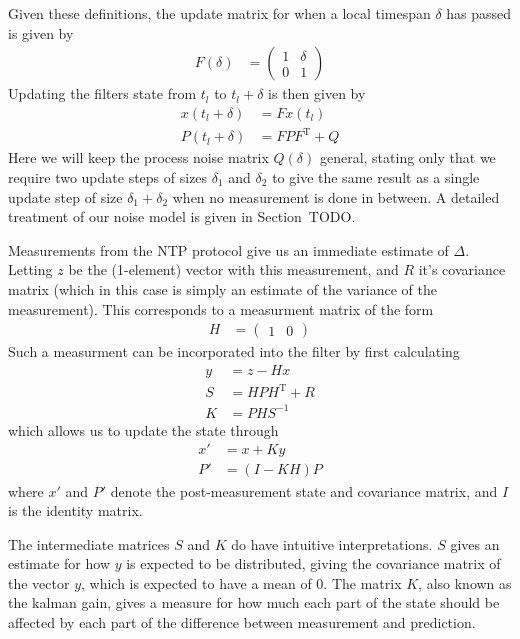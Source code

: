 \documentclass{article}
\begin{document}
Given these definitions, the update matrix for when a local timespan $\delta$ has passed is given by
\begin{align}
F(\delta) &= \begin{pmatrix}
1 & \delta\\
0 & 1
\end{pmatrix}
\end{align}
Updating the filters state from $t_l$ to $t_l+\delta$ is then given by
\begin{align}
x(t_l+\delta) &= Fx(t_l)\\
P(t_l+\delta) &= FPF^\mathrm{T} + Q
\end{align}
Here we will keep the process noise matrix $Q(\delta)$ general, stating only that we require two update steps of sizes $\delta_1$ and $\delta_2$
to give the same result as a single update step of size $\delta_1 + \delta_2$ when no measurement is done in between.
A detailed treatment of our noise model is given in Section~TODO.

Measurements from the NTP protocol give us an immediate estimate of $\Delta$. Letting $z$ be the (1-element) vector with this measurement,
and $R$ it's covariance matrix (which in this case is simply an estimate of the variance of the measurement).
This corresponds to a measurment matrix of the form
\begin{align}
H &= \begin{pmatrix}
1 & 0
\end{pmatrix}
\end{align}
Such a measurment can be incorporated into the filter by first calculating
\begin{align}
y &= z - Hx\\
S &= H P H^\mathrm{T} + R\\
K &= P H S^{-1}
\end{align}
which allows us to update the state through
\begin{align}
x' &= x + Ky\\
P' &= (I - K H)P
\end{align}
where $x'$ and $P'$ denote the post-measurement state and covariance matrix, and $I$ is the identity matrix.

The intermediate matrices $S$ and $K$ do have intuitive interpretations. $S$ gives an estimate for how $y$ is expected to be distributed, giving the covariance matrix of the vector $y$, which is expected to have a mean of $0$. The matrix $K$, also known as the kalman gain, gives a measure for how much each part of the state should be affected by each part of the difference between measurement and prediction.
\end{document}
